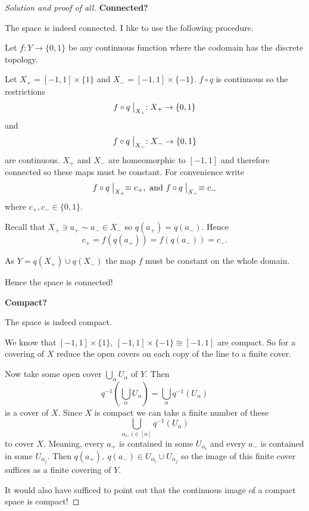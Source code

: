 \begin{proof}[Solution and proof of all]
    \textbf{Connected?}
    
    The space is indeed connected. 
    I like to use the following procedure. 

    Let $f : Y \to \{0,1\}$ be any continuous function 
    where the codomain has the discrete topology. 

    Let $X_+ = [-1,1] \times \{1\}$ and 
    $X_- = [-1,1] \times \{-1\}$. 
    $f \circ q$ is continuous so the restrictions 
    \[
        f \circ q \bigm|_{X_+} : X_+ \to \{0,1\}
    \]
    and 
    \[
        f \circ q\bigm|_{X_-} : X_- \to \{0,1\}
    \]
    are continuous. $X_+$ and $X_-$ are homeomorphic to 
    $[-1,1]$ and therefore connected so
    these maps must be constant. 
    For convenience write  
    \[
        f \circ q\bigm|_{X_+} \equiv c_+, 
        \ \text{and} \ 
        f \circ q\bigm|_{X_-} \equiv c_- 
    \]
    where $c_+,c_- \in \{0,1\}$. 

    Recall that $X_+ \ni a_+ \sim a_- \in X_-$ so 
    $q(a_+) = q(a_-)$. Hence 
    \[
        c_+ = f(q(a_+)) = f(q(a_-)) = c_-. 
    \]

    As $Y = q(X_+) \cup q(X_-)$ the map $f$ must be constant
    on the whole domain. 

    Hence the space is 
    connected!

    \textbf{Compact?} 

    The space is indeed compact. 

    We know that $[-1,1] \times \{1\}, \ 
    [-1,1] \times \{-1\} \cong [-1,1]$ are compact. 
    So for a covering of $X$ reduce 
    the open covers on each copy of the line to a finite 
    cover. 

    Now take some open cover $\bigcup_{\alpha} U_\alpha$ 
    of $Y$. Then 
    \[
        q^{-1}\left(\bigcup_\alpha U_\alpha \right) 
        = \bigcup_\alpha q^{-1}(U_\alpha)
    \]
    is a cover of $X$. Since $X$ is compact we can 
    take a finite number of these 
    \[
        \bigcup_{\alpha_i, \ i \in [n]} q^{-1}(U_\alpha)
    \]
    to cover $X$. Meaning, every $a_+$ is contained in 
    some $U_{\alpha_i}$ and every $a_-$ is contained in 
    some $U_{\alpha_j}$. Then $q(a_+), \ q(a_-) \in 
    U_{\alpha_i} \cup U_{\alpha_j}$ so the image of this 
    finite cover suffices as a finite covering of $Y$. 
    
    It would also have sufficed to point out that 
    the continuous image of a compact space is 
    compact!
\end{proof}

